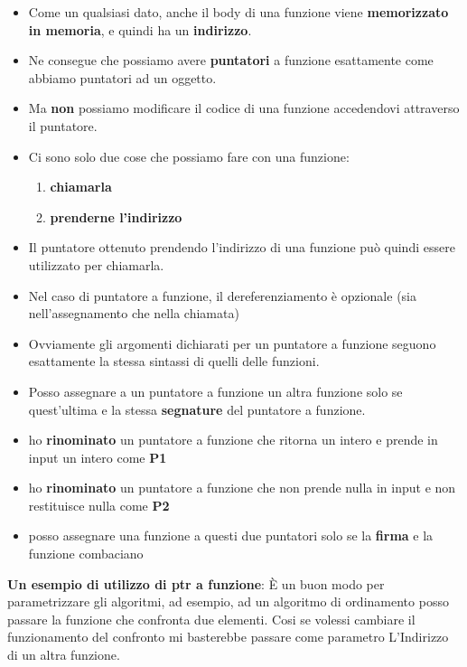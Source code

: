 \begin{itemize}
    \item Come un qualsiasi dato, anche il body di una funzione
    viene \textbf{memorizzato in memoria}, e quindi ha un \textbf{indirizzo}.
    \item Ne consegue che possiamo avere \textbf{puntatori} a funzione
    esattamente come abbiamo puntatori ad un oggetto.
    \item Ma \textbf{non} possiamo modificare il codice di una funzione
    accedendovi attraverso il puntatore.
    \item Ci sono solo due cose che possiamo fare con una
    funzione:
    \begin{enumerate}
        \item \textbf{chiamarla}
        \item \textbf{prenderne l’indirizzo} 
    \end{enumerate}
    \item Il puntatore ottenuto prendendo l’indirizzo di una funzione
    può quindi essere utilizzato per chiamarla.
    
    \item Nel caso di puntatore a funzione, il dereferenziamento è
    opzionale (sia nell’assegnamento che nella chiamata)
    \item Ovviamente gli argomenti dichiarati per un puntatore a
    funzione seguono esattamente la stessa sintassi di quelli
    delle funzioni.
    \item Posso assegnare a un puntatore a funzione un altra funzione solo se quest'ultima e la stessa \textbf{segnature} del puntatore a funzione.
    
    \item ho \textbf{rinominato} un puntatore a funzione che ritorna un intero e prende in input un intero come \textbf{P1}
    \item  ho \textbf{rinominato} un puntatore a funzione che non prende nulla in input e non restituisce nulla come \textbf{P2}
    \item  posso assegnare una funzione a questi due puntatori solo se la \textbf{firma} e la funzione combaciano 
\end{itemize}
\textbf{Un esempio di utilizzo di ptr a funzione}: È un buon modo per parametrizzare gli algoritmi, ad
esempio, ad un algoritmo di ordinamento posso passare la funzione che confronta due elementi. Cosi se volessi cambiare il funzionamento del confronto mi basterebbe passare come parametro L'Indirizzo di un altra funzione.

